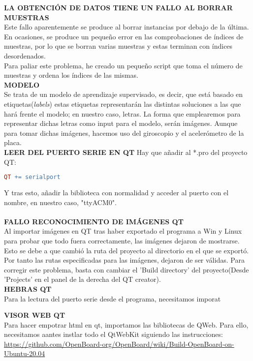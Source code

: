 \textbf{LA OBTENCIÓN DE DATOS TIENE UN FALLO AL BORRAR MUESTRAS} \\
Este fallo aparentemente se produce al borrar instancias por debajo de
la última. En ocasiones, se produce un pequeño error en las comprobaciones
de índices de muestras, por lo que se borran varias muestras y estas terminan
con índices desordenados.\\
Para paliar este problema, he creado un pequeño script que toma el número de
muestras y ordena los índices de las mismas.\\

\textbf{MODELO}\\
Se trata de un modelo de aprendizaje supervisado, es decir, que está basado en
etiquetas(\textit{labels}) estas etiquetas representarán las distintas soluciones
a las que hará frente el modelo; en nuestro caso, letras.
La forma que emplearemos para representar dichas letras como input para el modelo,
serán imágenes. Aunque para tomar dichas imágenes, hacemos uso del giroscopio
y el acelerómetro de la placa.\\


\textbf{LEER DEL PUERTO SERIE EN QT}
Hay que añadir al *.pro del proyecto QT:
\begin{lstlisting}[language=make]
  QT += serialport
\end{lstlisting}
Y tras esto, añadir la biblioteca con normalidad y acceder al puerto
con el nombre, en nuestro caso, "ttyACM0".\\\\

\textbf{FALLO RECONOCIMIENTO DE IMÁGENES QT}\\
Al importar imágenes en QT tras haber exportado el programa a Win y Linux para
probar que todo fuera correctamente, las imágenes dejaron de mostrarse.\\
Esto se debe a que cambió la ruta del proyecto al directorio en el que se
exportó. Por tanto las rutas especificadas para las imágenes, dejaron de ser
válidas. Para corregir este problema, basta con cambiar el 'Build directory' del
proyecto(Desde 'Projects' en el panel de la derecha del QT creator).\\

\textbf{HEBRAS QT}\\
Para la lectura del puerto serie desde el programa, necesitamos imporat

\textbf{VISOR WEB QT}\\
Para hacer empotrar html en qt, importamos las bibliotecas de QWeb. Para ello,
necesitamos aantes instlar todo el QtWebKit siguiendo las instrucciones:
\url{https://github.com/OpenBoard-org/OpenBoard/wiki/Build-OpenBoard-on-Ubuntu-20.04}

